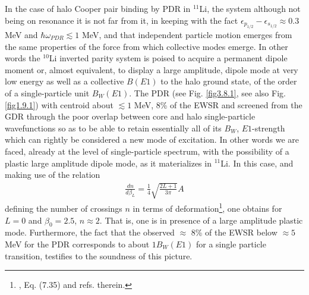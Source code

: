 \begin{subappendices}
In the case of halo Cooper pair binding by PDR in $^{11}$Li, the system although not being on resonance it is not far from it, in keeping with the fact $\epsilon_{p_{1/2}}-\epsilon_{s_{1/2}}\approx 0.3$ MeV and $\hbar\omega_{PDR}\lesssim1$ MeV, and that independent particle motion emerges from the same properties of the force from which collective modes emerge. In other words the $^{10}$Li inverted parity system is poised to acquire a permanent dipole moment or, almost equivalent, to display a large amplitude, dipole mode at very low energy as well as a collective $B(E1)$ to the halo ground state, of the order of a single-particle unit $B_{W}(E1)$. The PDR (see Fig. \ref{fig3.8.1}, see also Fig. \ref{fig1.9.1}) with centroid about $\lesssim 1$ MeV, 8\% of the EWSR and  screened from the GDR through the poor overlap between core and halo single-particle wavefunctions so as to be able to retain essentially all of its $B_{W}$, $E1$-strength which can rightly be considered a new mode of excitation. In other words we are faced, already at the level of single-particle spectrum, with the possibility of a plastic large amplitude dipole mode, as it materializes in $^{11}$Li. In this case, and making use of the relation 
\begin{align}\label{eq3C6}
\frac{dn}{d\beta_L}=\frac{1}{4}\sqrt{\frac{2L+1}{3\pi}}A
\end{align}  
defining the number of crossings $n$ in terms of deformation\footnote{\cite{Brink:05}, Eq. (7.35) and refs. therein.}, one obtains for $L=0$ and $\beta_0=2.5$, $n\approx 2$. That is, one is in presence of a large amplitude plastic mode.
Furthermore, the fact  that the observed $\approx$ 8\% of the EWSR below $\approx 5$ MeV for the PDR corresponds to about $1B_{W}(E1)$ for a single particle transition, testifies to the soundness of this picture. 


\end{subappendices}
